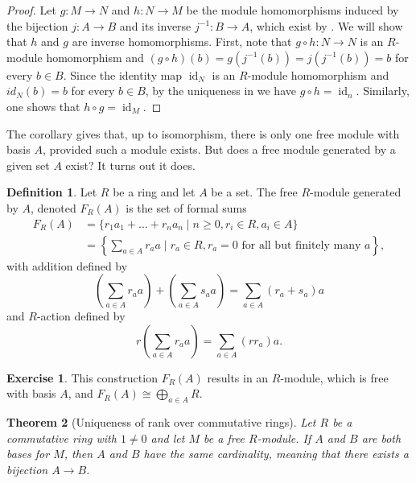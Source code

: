 \documentclass[12pt]{report}
\newtheorem{theorem}{Theorem}[chapter]
\numberwithin{equation}{section}
\numberwithin{theorem}{chapter}
\theoremstyle{definition}
\newtheorem{definition}[theorem]{Definition}
\newtheorem{exercise}{Exercise}
\newtheorem*{basic properties}{Basic Properties}
\newtheorem*{Important Remark}{Important Remark}
\DeclareMathOperator{\id}{id}
\begin{document}
\begin{proof}
Let $g:M\to N$ and $h:N\to M$ be the module homomorphisms induced by the bijection $j:A\to B$ and its inverse $j^{-1}:B\to A$, which exist by . We will show that $h$ and $g$ are inverse homomorphisms. 
First, note that $g \circ h:N\to N$ is an $R$-module homomorphism and $(g \circ h)(b) = g(j^{-1}(b))=j(j^{-1}(b))=b$ for every $b\in B$. Since the identity map $\id_N$ is an $R$-module homomorphism and $id_N(b)=b$ for every $b\in B$, by the uniqueness in  we have $g \circ h = \id_n$. Similarly, one shows that $h \circ g = \id_M$.
\end{proof}



The corollary gives that, up to isomorphism, there is only one free module with basis $A$, provided such a module exists. But does a free module generated by a given set $A$ exist? It turns out it does.  

\begin{definition}
Let $R$ be a ring and let $A$ be a set. The free $R$-module generated by $A$, denoted $F_R(A)$ is the set of formal sums 
\begin{align*}
F_R(A) &= \{r_1a_1 + \dots + r_na_n \mid n \geqslant 0, r_i \in R, a_i \in A\} \\
&= \left\lbrace \sum_{a \in A} r_aa \mid r_a \in R, r_a = 0 \text{ for all but finitely many }a \right\rbrace,
\end{align*} with addition defined by 
$$\left(\sum_{a \in A} r_aa\right) + \left(\sum_{a \in A} s_aa \right) = \sum_{a \in A} (r_a + s_a)a$$ and $R$-action defined by 
$$r \left(\sum_{a \in A} r_aa \right) = \sum_{a \in A} (rr_a)a.$$  
\end{definition}

\begin{exercise}
This construction $F_R(A)$ results in an $R$-module, which is free with basis $A$, and $F_R(A)\cong \bigoplus_{a\in A}R$.
\end{exercise}




\begin{theorem}[Uniqueness of rank over commutative rings]\label{thm:rank}
Let $R$ be a commutative ring with $1 \neq 0$ and let $M$ be a free $R$-module. If $A$ and $B$ are both bases for $M$, then $A$ and $B$ have the same cardinality, meaning that there exists a bijection $A \to B$.
\end{theorem}
\end{document}
